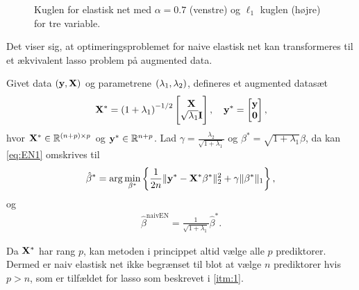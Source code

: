 %
\begin{figure}[H]
\centering
\caption{Kuglen for elastisk net med \(\alpha=0.7\) (venstre) og \(\ell_1\) kuglen (højre) for tre variable.}
\label{fig:elastisk_net}
\end{figure}
%
Det viser sig, at optimeringsproblemet for naive elastisk net kan transformeres til et ækvivalent lasso problem på augmented data.
%
\begin{lem} \label{lem:elastisk_net}
Givet data \(\del{\y, \X}\) og parametrene \(\del{\lambda_1, \lambda_2}\), defineres et augmented datasæt 
\begin{align*}
\X^* = \del{1 + \lambda_1}^{-1/2} \begin{bmatrix}
\X \\ \sqrt{\lambda_1} \mathbf{I}
\end{bmatrix}, \quad \y^* = \begin{bmatrix}
\y \\ \mathbf{0}
\end{bmatrix},
\end{align*}
hvor \(\X^* \in \mathbb{R}^{\del{n+p} \times p}\) og \(\mathbf{y}^* \in \mathbb{R}^{n+p}\).
Lad \(\gamma = \frac{\lambda_2}{\sqrt{1+\lambda_1}}\) og \(\beta^* = \sqrt{1+\lambda_1} \beta\), da kan \eqref{eq:EN1} omskrives til
\begin{align*}
\hat{\beta}^* = \arg \min_{\beta^*} \cbr{\frac{1}{2n} \Vert \y^* - \X^* \beta^* \Vert_2^2 +\gamma \Vert \beta^* \Vert_1},
\end{align*}
og
\begin{align*}
\hat{\beta}^\text{naivEN} = \frac{1}{\sqrt{1+\lambda_1}} \hat{\beta}^*.
\end{align*}
\end{lem}
%
Da \(\mathbf{X}^*\) har rang \(p\), kan metoden i princippet altid vælge alle \(p\) prediktorer.
Dermed er naiv elastisk net ikke begrænset til blot at vælge \(n\) prediktorer hvis \(p > n\), som er tilfældet for lasso som beskrevet i \ref{itm:1}.
